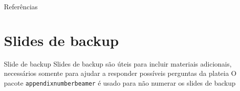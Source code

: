 \documentclass[aspectratio=169]{beamer}
\begin{document}
\begin{frame}[allowframebreaks]{Referências}
    \nocite{*}
    \printbibliography
\end{frame}
    
%     
%     

\appendix

\section{Slides de backup}

\begin{frame}{Slide de backup}
    Slides de backup são úteis para incluir materiais adicionais, necessários somente para ajudar a responder possíveis perguntas da plateia
    \vfill
    O pacote \texttt{appendixnumberbeamer} é usado para não numerar os slides de backup
\end{frame}
\end{document}
